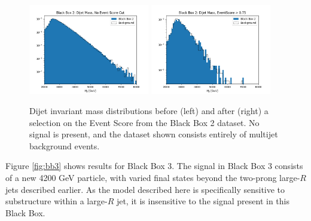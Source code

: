 \documentclass[letterpaper,11pt]{article}
\begin{document}
\begin{figure}[h!]
	\begin{center}
		\includegraphics[width=0.47\textwidth]{imgs/BB2.png}
		\includegraphics[width=0.47\textwidth]{imgs/BB2_Cut.png}
	\end{center}
	\caption{Dijet invariant mass distributions before (left) and after (right) a selection on the Event Score from the Black Box 2 dataset. No signal is present, and the dataset shown consists entirely of multijet background events.}
	\label{fig:bb2}
\end{figure}

Figure \ref{fig:bb3} shows results for Black Box 3. The signal in Black Box 3 consists of a new 4200 GeV particle, with varied final states beyond the two-prong large-$R$ jets described earlier. As the model described here is specifically sensitive to substructure within a large-$R$ jet, it is insensitive to the signal present in this Black Box. 
\end{document}
